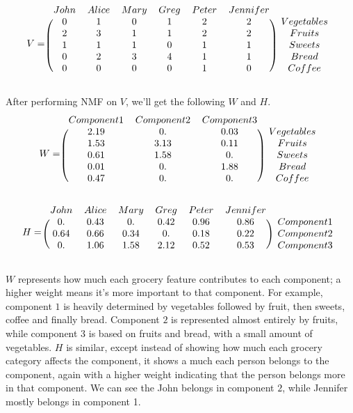 \[
V = 
\begin{blockarray}{ccccccc}
  John & Alice & Mary & Greg & Peter & Jennifer \\
  \begin{block}{(cccccc)c}
     0 & 1 & 0 & 1 & 2 & 2 & Vegetables \\
     2 & 3 & 1 & 1 & 2 & 2 & Fruits \\
     1 & 1 & 1 & 0 & 1 & 1 & Sweets \\
     0 & 2 & 3 & 4 & 1 & 1 & Bread \\
     0 & 0 & 0 & 0 & 1 & 0 & Coffee \\
  \end{block}
  \end{blockarray}
\]

After performing NMF on $V$, we'll get the following $W$ and $H$.
\[
W = 
\begin{blockarray}{cccc}
   Component 1 & Component 2 & Component 3\\
  \begin{block}{(ccc)c} 	
	2.19 & 0. & 0.03 & Vegetables\\
	1.53 & 3.13 & 0.11 & Fruits\\
    0.61 & 1.58 & 0. & Sweets\\
    0.01 & 0. & 1.88 & Bread\\
    0.47 & 0.  & 0.  & Coffee\\
   \end{block}
   \end{blockarray}
\]

\[
H = 
\begin{blockarray}{ccccccc}
  John & Alice & Mary & Greg & Peter & Jennifer\\
  \begin{block}{(cccccc)c} 	
   0.  & 0.43 & 0. & 0.42 &  0.96   &   0.86 & Component 1\\
   0.64  & 0.66 & 0.34 & 0. &  0.18   &   0.22 & Component 2\\
   0.  & 1.06 & 1.58 & 2.12 &  0.52   &   0.53 & Component 3\\
   \end{block}
   \end{blockarray}
\]

$W$ represents how much each grocery feature contributes to each component; a higher weight means it's more important to that component.
For example, component $1$ is heavily determined by vegetables followed by fruit, then sweets, coffee and finally bread.
Component $2$ is represented almost entirely by fruits, while component $3$ is based on fruits and bread, with a small amount of vegetables.
$H$ is similar, except instead of showing how much each grocery category affects the component, it shows a much each person belongs to the component, again with a higher weight indicating that the person belongs more in that component.
We can see the John belongs in component $2$, while Jennifer mostly belongs in component 1.

